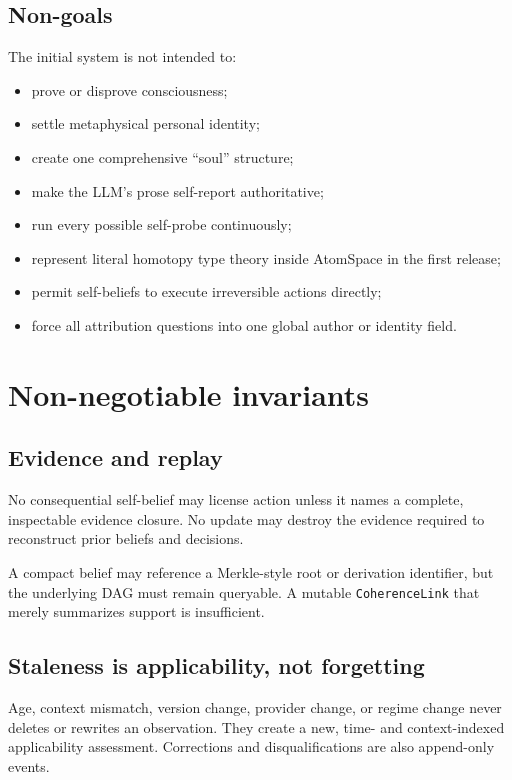 \documentclass[11pt,oneside]{report}
\begin{document}
\section{Non-goals}

The initial system is not intended to:

\begin{itemize}
  \item prove or disprove consciousness;
  \item settle metaphysical personal identity;
  \item create one comprehensive ``soul'' structure;
  \item make the LLM's prose self-report authoritative;
  \item run every possible self-probe continuously;
  \item represent literal homotopy type theory inside AtomSpace in the first release;
  \item permit self-beliefs to execute irreversible actions directly;
  \item force all attribution questions into one global author or identity field.
\end{itemize}

\chapter{Non-negotiable invariants}

\section{Evidence and replay}

\begin{invariantbox}
No consequential self-belief may license action unless it names a complete, inspectable evidence closure. No update may destroy the evidence required to reconstruct prior beliefs and decisions.
\end{invariantbox}

A compact belief may reference a Merkle-style root or derivation identifier, but the underlying DAG must remain queryable. A mutable \texttt{CoherenceLink} that merely summarizes support is insufficient.

\section{Staleness is applicability, not forgetting}

\begin{invariantbox}
Age, context mismatch, version change, provider change, or regime change never deletes or rewrites an observation. They create a new, time- and context-indexed applicability assessment. Corrections and disqualifications are also append-only events.
\end{invariantbox}
\end{document}
